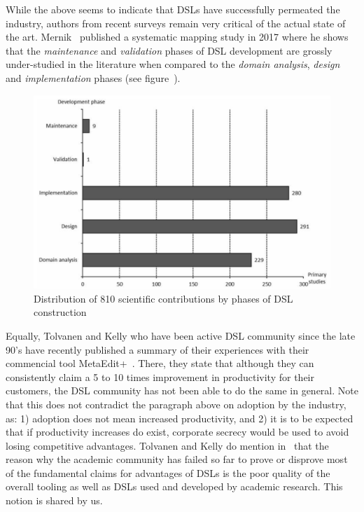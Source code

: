 \documentclass{article}
\begin{document}
While the above seems to indicate that DSLs have successfully permeated the
industry, authors from recent surveys remain very critical of the actual state
of the art. Mernik~\cite{Mernik17} published a systematic mapping study in
2017 where he shows that the \emph{maintenance} and \emph{validation} phases of
DSL development are grossly under-studied in the literature when compared to the
\emph{domain analysis}, \emph{design} and \emph{implementation} phases (see
figure~\cite{fig:DSL_design_phases}).

\begin{figure}[!h]
\centering 
\includegraphics[width=1\textwidth]{./figures/DSL_design_phases}
\caption{Distribution of 810 scientific contributions by phases of DSL
construction}
\label{fig:DSL_design_phases}
\end{figure}

Equally, Tolvanen and Kelly who have been active DSL community since the late
90's have recently published a summary of their experiences with their
commencial tool MetaEdit+~\cite{TolvanenKelly2016}. There, they state that
although they can consistently claim a 5 to 10 times improvement in productivity
for their customers, the DSL community has not been able to do the same in
general. Note that this does not contradict the paragraph above on adoption by
the industry, as: 1) adoption does not mean increased productivity, and 2) it is
to be expected that if productivity increases do exist, corporate secrecy would
be used to avoid losing competitive advantages. Tolvanen and Kelly do mention
in~\cite{TolvanenKelly2016} that the reason why the academic community has
failed so far to prove or disprove most of the fundamental claims for advantages
of DSLs is the poor quality of the overall tooling as well as DSLs used and
developed by academic research. This notion is shared by us.
\end{document}
